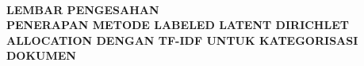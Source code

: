 \renewcommand{\headrulewidth}{3pt} 
\thispagestyle{fancy}

\hspace{-2cm}\\[1cm]
\begin{center}
{\bfseries LEMBAR PENGESAHAN}\\[1.0 cm]
{\bfseries PENERAPAN METODE LABELED LATENT DIRICHLET ALLOCATION DENGAN TF-IDF UNTUK KATEGORISASI DOKUMEN} \\[0.5 cm]
\end{center}

\vspace{0.5cm}


